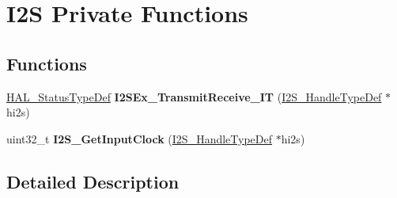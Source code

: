 \hypertarget{group___i2_s_ex___private___functions}{}\section{I2S Private Functions}
\label{group___i2_s_ex___private___functions}
\subsection*{Functions}
\begin{DoxyCompactItemize}
\item 
\hyperlink{stm32f4xx__hal__def_8h_a63c0679d1cb8b8c684fbb0632743478f}{H\+A\+L\+\_\+\+Status\+Type\+Def} {\bfseries I2\+S\+Ex\+\_\+\+Transmit\+Receive\+\_\+\+IT} (\hyperlink{struct_i2_s___handle_type_def}{I2\+S\+\_\+\+Handle\+Type\+Def} $\ast$hi2s)\hypertarget{group___i2_s_ex___private___functions_gadb32478994e5c63d4691dba692305969}{}\label{group___i2_s_ex___private___functions_gadb32478994e5c63d4691dba692305969}

\item 
uint32\+\_\+t {\bfseries I2\+S\+\_\+\+Get\+Input\+Clock} (\hyperlink{struct_i2_s___handle_type_def}{I2\+S\+\_\+\+Handle\+Type\+Def} $\ast$hi2s)\hypertarget{group___i2_s_ex___private___functions_ga6872aa51c9889a69806768443ad9bd21}{}\label{group___i2_s_ex___private___functions_ga6872aa51c9889a69806768443ad9bd21}

\end{DoxyCompactItemize}


\subsection{Detailed Description}
